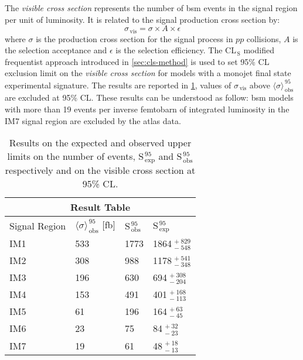 The \emph{visible cross section} represents the number of \gls{bsm} events in
the signal region per unit of luminosity. It is related to the signal production
cross section by:
\begin{equation}
  \label{eq:113}
  \sigma_\mathrm{\, vis} = \sigma \times A \times \epsilon
\end{equation}
where $\sigma$ is the production cross section for the signal process in $pp$
collisions, $A$ is the selection acceptance and $\epsilon$ is the selection
efficiency. The CL$_\mathrm{\, S}$ modified frequentist approach introduced in
\cref{sec:cls-method} is used to set 95\% CL exclusion limit on the
\emph{visible cross section} for models with a monojet final state experimental
signature. The results are reported in \cref{tab:cs_vis_results}, values of
$\sigma_\mathrm{\, vis}$ above $\langle \sigma \rangle_\mathrm{\, obs}^{\, 95}$
are excluded at 95\% CL\@. These results can be understood as follow: \gls{bsm}
models with more than 19 events per inverse femtobarn of integrated luminosity
in the IM7 signal region are excluded by the \gls{atlas} data.
\begin{table}[!h]
  \centering
  \begin{tabular}{llll}
    \toprule
    \multicolumn{4}{c}{Result Table} \\
    \midrule \midrule
    Signal Region & $\langle \sigma \rangle_\mathrm{\, obs}^{\, 95}$ [fb] & S$_\mathrm{\, obs}^{\, 95}$ & S$_\mathrm{\, exp}^{\, 95}$ \\
    \midrule
    IM1 & 533 & 1773 & 1864$_{\, -548}^{\, +829}$ \B \\
    IM2 & 308 & 988 & 1178$_{\, -348}^{\, +541}$ \T \B \\
    IM3 & 196 & 630 & 694$_{\, -204}^{\, +308}$ \T \B \\
    IM4 & 153 & 491 & 401$_{\, -113}^{\, +168}$ \T \B \\
    IM5 & 61 & 196 & 164$_{\, -45}^{\, +63}$ \T \B \\
    IM6 & 23 & 75 & 84$_{\, -23}^{\, +32}$ \T \B\\
    IM7 & 19 & 61 & 48$_{\, -13}^{\, +18}$ \T \\
    \bottomrule
  \end{tabular}
  \caption{Results on the expected and observed upper limits on the number of
    events, S$_\mathrm{\, exp}^{\, 95}$ and S$_\mathrm{\, obs}^{\, 95}$
    respectively and on the visible cross section at 95\% CL.}
  \label{tab:cs_vis_results}
\end{table}

